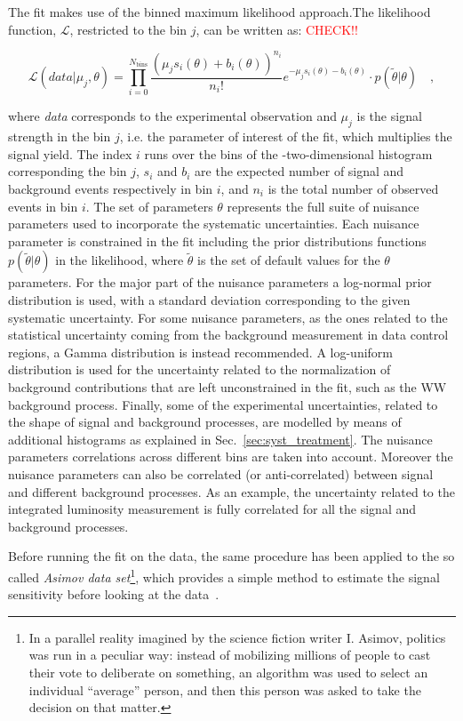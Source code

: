 The fit makes use of the binned maximum likelihood approach.The likelihood function, $\mathcal{L}$, restricted to the \pth bin $j$, can be written as: \textcolor{red}{CHECK!!}

\begin{equation}
\mathcal{L}(data | \mu_j,\theta) = \prod_{i=0}^{N_\mathrm{bins}} \frac{(\mu_j s_i(\theta) + b_i(\theta))^{n_i}}{n_i!}e^{-\mu_j s_i(\theta) - b_i(\theta)} \cdot p(\tilde{\theta} | \theta) \quad ,
\end{equation}

where \emph{data} corresponds to the experimental observation and $\mu_j$ is the signal strength in the bin $j$, i.e. the parameter of interest of the fit, which multiplies the signal yield. The index $i$ runs over the bins of the \mll-\mt two-dimensional histogram corresponding the \pth bin $j$, $s_i$ and $b_i$ are the expected number of signal and background events respectively in bin $i$, and $n_i$ is the total number of observed events in bin $i$. The set of parameters $\theta$ represents the full suite of nuisance parameters used to incorporate the systematic uncertainties. Each nuisance parameter is constrained in the fit including the prior distributions functions $p(\tilde{\theta} | \theta)$ in the likelihood, where $\tilde{\theta}$ is the set of default values for the $\theta$ parameters. For the major part of the nuisance parameters a log-normal prior distribution is used, with a standard deviation corresponding to the given systematic uncertainty. For some nuisance parameters, as the ones related to the statistical uncertainty coming from the background measurement in data control regions, a Gamma distribution is instead recommended. A log-uniform distribution is used for the uncertainty related to the normalization of background contributions that are left unconstrained in the fit, such as the WW background process.
Finally, some of the experimental uncertainties, related to the shape of signal and background processes, are modelled by means of additional histograms as explained in Sec.~\ref{sec:syst_treatment}. The nuisance parameters correlations across different \pth bins are taken into account. Moreover the nuisance parameters can also be correlated (or anti-correlated) between signal and different background processes. As an example, the uncertainty related to the integrated luminosity measurement is fully correlated for all the signal and background processes.

Before running the fit on the data, the same procedure has been applied to the so called \textit{Asimov data set}\footnote{In a parallel reality imagined by the science fiction writer I. Asimov, politics was run in a peculiar way: instead of mobilizing millions of people to cast their vote to deliberate on something, an algorithm was used to select an individual ``average'' person, and then this person was asked to take the decision on that matter.}, which provides a simple method to estimate the signal sensitivity before looking at the data~\cite{Cowan:2010js}.


